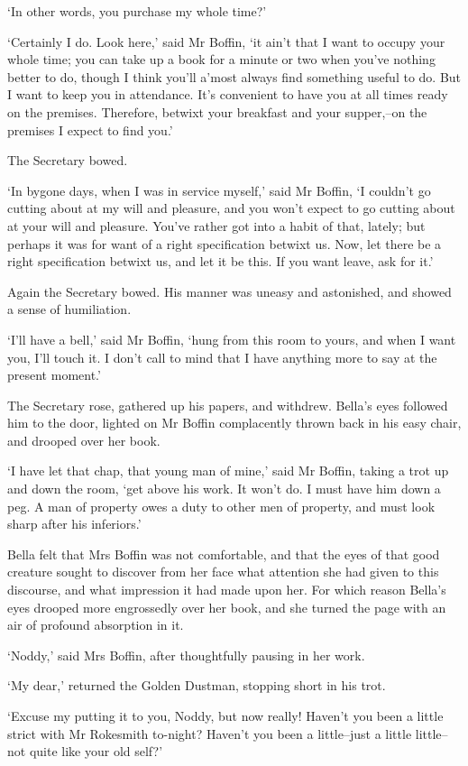 ‘In other words, you purchase my whole time?’

‘Certainly I do. Look here,’ said Mr Boffin, ‘it ain’t that I want to
occupy your whole time; you can take up a book for a minute or two when
you’ve nothing better to do, though I think you’ll a’most always find
something useful to do. But I want to keep you in attendance. It’s
convenient to have you at all times ready on the premises. Therefore,
betwixt your breakfast and your supper,--on the premises I expect to
find you.’

The Secretary bowed.

‘In bygone days, when I was in service myself,’ said Mr Boffin, ‘I
couldn’t go cutting about at my will and pleasure, and you won’t expect
to go cutting about at your will and pleasure. You’ve rather got into
a habit of that, lately; but perhaps it was for want of a right
specification betwixt us. Now, let there be a right specification
betwixt us, and let it be this. If you want leave, ask for it.’

Again the Secretary bowed. His manner was uneasy and astonished, and
showed a sense of humiliation.

‘I’ll have a bell,’ said Mr Boffin, ‘hung from this room to yours,
and when I want you, I’ll touch it. I don’t call to mind that I have
anything more to say at the present moment.’

The Secretary rose, gathered up his papers, and withdrew. Bella’s eyes
followed him to the door, lighted on Mr Boffin complacently thrown back
in his easy chair, and drooped over her book.

‘I have let that chap, that young man of mine,’ said Mr Boffin, taking a
trot up and down the room, ‘get above his work. It won’t do. I must have
him down a peg. A man of property owes a duty to other men of property,
and must look sharp after his inferiors.’

Bella felt that Mrs Boffin was not comfortable, and that the eyes of
that good creature sought to discover from her face what attention she
had given to this discourse, and what impression it had made upon her.
For which reason Bella’s eyes drooped more engrossedly over her book,
and she turned the page with an air of profound absorption in it.

‘Noddy,’ said Mrs Boffin, after thoughtfully pausing in her work.

‘My dear,’ returned the Golden Dustman, stopping short in his trot.

‘Excuse my putting it to you, Noddy, but now really! Haven’t you been
a little strict with Mr Rokesmith to-night? Haven’t you been a
little--just a little little--not quite like your old self?’

